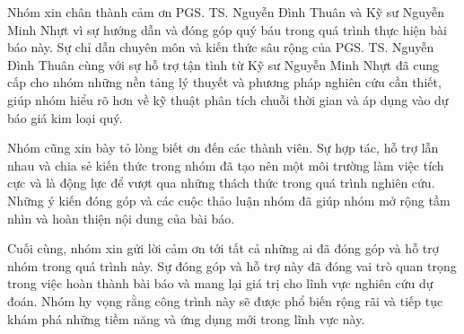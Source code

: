 
Nhóm xin chân thành cảm ơn PGS. TS. Nguyễn Đình Thuân và Kỹ sư Nguyễn Minh Nhựt vì sự hướng dẫn và đóng góp quý báu trong quá trình thực hiện bài báo này. Sự chỉ dẫn chuyên môn và kiến thức sâu rộng của PGS. TS. Nguyễn Đình Thuân cùng với sự hỗ trợ tận tình từ Kỹ sư Nguyễn Minh Nhựt đã cung cấp cho nhóm những nền tảng lý thuyết và phương pháp nghiên cứu cần thiết, giúp nhóm hiểu rõ hơn về kỹ thuật phân tích chuỗi thời gian và áp dụng vào dự báo giá kim loại quý.

Nhóm cũng xin bày tỏ lòng biết ơn đến các thành viên. Sự hợp tác, hỗ trợ lẫn nhau và chia sẻ kiến thức trong nhóm đã tạo nên một môi trường làm việc tích cực và là động lực để vượt qua những thách thức trong quá trình nghiên cứu. Những ý kiến đóng góp và các cuộc thảo luận nhóm đã giúp nhóm mở rộng tầm nhìn và hoàn thiện nội dung của bài báo.

Cuối cùng, nhóm xin gửi lời cảm ơn tới tất cả những ai đã đóng góp và hỗ trợ nhóm trong quá trình này. Sự đóng góp và hỗ trợ này đã đóng vai trò quan trọng trong việc hoàn thành bài báo và mang lại giá trị cho lĩnh vực nghiên cứu dự đoán. Nhóm hy vọng rằng công trình này sẽ được phổ biến rộng rãi và tiếp tục khám phá những tiềm năng và ứng dụng mới trong lĩnh vực này.